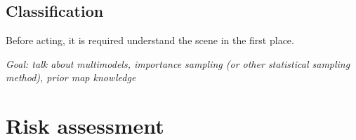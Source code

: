 \subsection{Classification}

Before acting, it is required understand the scene in the first place. 

\textit{Goal: talk about multimodels, importance sampling (or other statistical sampling method), prior map knowledge }


\section{Risk assessment}



